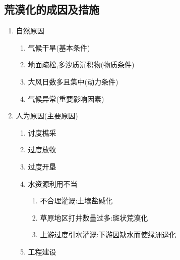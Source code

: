 \documentclass[a4paper]{article}
\begin{document}
    \subsection{荒漠化的成因及措施}
    \begin{enumerate}
        \item 自然原因
        \begin{enumerate}
            \item 气候干旱(基本条件)
            \item 地面疏松,多沙质沉积物(物质条件)
            \item 大风日数多且集中(动力条件)
            \item 气候异常(重要影响因素)
        \end{enumerate}
        \item 人为原因(主要原因)
        \begin{enumerate}
            \item 讨度樵采
            \item 过度放牧
            \item 过度开垦
            \item 水资源利用不当
            \begin{enumerate}
                \item 不合理灌溉:土壤盐碱化
                \item 草原地区打井数量过多:斑状荒漠化
                \item 上游过度引水灌溉:下游因缺水而使绿洲退化
            \end{enumerate}
            \item 工程建设
        \end{enumerate}
    \end{enumerate}
\end{document}
